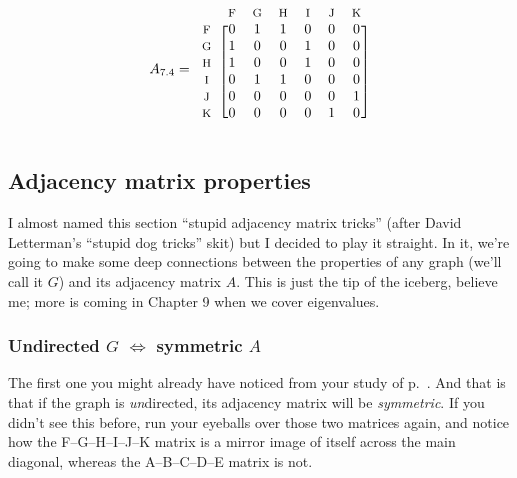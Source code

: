 \begin{alttitles}
\[
A_{7.4} = 
\begin{blockarray}{ccccccc}
& {\footnotesize\textrm{F}} & {\footnotesize\textrm{G}} & {\footnotesize\textrm{H}} & {\footnotesize\textrm{I}} & {\footnotesize\textrm{J}} & {\footnotesize\textrm{K}} \\
\begin{block}{c[cccccc]}
{\footnotesize\textrm{F}} & 0 & 1 & 1 & 0 & 0 & 0 \\
{\footnotesize\textrm{G}} & 1 & 0 & 0 & 1 & 0 & 0 \\
{\footnotesize\textrm{H}} & 1 & 0 & 0 & 1 & 0 & 0 \\
{\footnotesize\textrm{I}} & 0 & 1 & 1 & 0 & 0 & 0 \\
{\footnotesize\textrm{J}} & 0 & 0 & 0 & 0 & 0 & 1 \\
{\footnotesize\textrm{K}} & 0 & 0 & 0 & 0 & 1 & 0 \\
\end{block}
\end{blockarray}
\]


\subsection{Adjacency matrix properties}


I almost named this section ``stupid adjacency matrix tricks'' (after David
Letterman's ``stupid dog tricks'' skit) but I decided to play it straight. In
it, we're going to make some deep connections between the properties of any
graph (we'll call it $G$) and its adjacency matrix $A$. This is just the tip of
the iceberg, believe me; more is coming in Chapter 9 when we cover eigenvalues.

\subsubsection{Undirected $G$ $\Leftrightarrow$ symmetric $A$}


The first one you might already have noticed from your study of
p.~\pageref{firstAdjacencyMatrix}. And that is that if the graph is
\textit{un}directed, its adjacency matrix will be \textit{symmetric}. If you
didn't see this before, run your eyeballs over those two matrices again, and
notice how the F--G--H--I--J--K matrix is a mirror image of itself across the
main diagonal, whereas the A--B--C--D--E matrix is not.


\end{alttitles}
